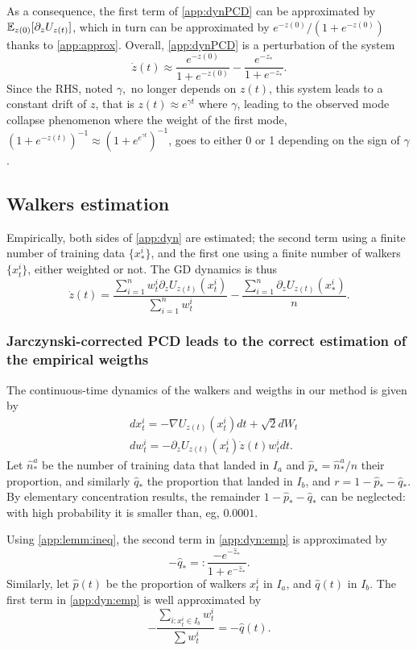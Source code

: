 \documentclass[a4paper,11pt]{extarticle}
\begin{document}
As a consequence, the first term of \eqref{app:dynPCD} can be approximated by $\mathbb{E}_{z(0)}[\partial_z U_{z(t)}]$, which in turn can be approximated by $e^{-z(0)}/(1 + e^{-z(0)})$ thanks to \eqref{app:approx}. Overall, \eqref{app:dynPCD} is a perturbation of the system
$$ \dot{z}(t)\approx \frac{e^{-z(0)}}{1 + e^{-z(0)}} - \frac{e^{-z_*}}{1 + e^{-z_*}}.$$
Since the RHS, noted $\gamma$, no longer depends on $z(t)$, this system leads to a constant drift of $z$, that is $z(t) \approx e^{\gamma t}$ where $\gamma$, leading to the observed mode collapse phenomenon where the weight of the first mode, $(1 + e^{-z(t)})^{-1} \approx (1 + e^{e^{\gamma t}})^{-1}$, goes to either 0 or 1 depending on the sign of $\gamma$. 

\subsection{Walkers estimation}

Empirically, both sides of \eqref{app:dyn} are estimated; the second term using a finite number of training data $\{x_*^i\}$, and the first one using a finite number of walkers $\{x_t^i\}$, either weighted or not. The GD dynamics is thus 
\begin{equation}\label{app:dyn:emp}
    \dot{z}(t) = \frac{\sum_{i=1}^n w_t^i \partial_z U_{z(t)}(x_t^i)}{\sum_{i=1}^n w_t^i} - \frac{\sum_{i=1}^n  \partial_z U_{z(t)}(x_*^i)}{n}. 
\end{equation}

\subsubsection*{Jarczynski-corrected PCD leads to the correct estimation of the empirical weigths}
The continuous-time dynamics of the walkers and weigths in our method is given by 
\begin{align}\label{app:systemj}
    &dx_t^i = -\nabla U_{z(t)}(x_t^i)dt + \sqrt{2}dW_t \\
    &dw_t^i = -\partial_z U_{z(t)}(x_t^i)\dot{z}(t)w_t^i dt.
\end{align}
Let $\hat{n}^a_*$ be the number of training data that landed in $I_a$ and $\hat{p}_* = \hat{n}^a_*/n$ their proportion, and similarly $\hat{q}_*$ the proportion that landed in $I_b$, and $r=1-\hat{p}_* - \hat{q}_*$. 
By elementary concentration results, the remainder $1 - \hat{p}_* - \hat{q}_*$ can be neglected: with high probability it is smaller than, eg, $0.0001$. 

Using \eqref{app:lemm:ineq}, the second term in \eqref{app:dyn:emp} is approximated by
$$- \hat{q}_* =: \frac{-e^{-\hat{z}_*}}{1 + e^{-\hat{z}_*}}.  $$
Similarly, let $\hat{p}(t)$ be the proportion of walkers $x_t^i$ in $I_a$, and $\hat{q}(t)$ in $I_b$. The first term in \eqref{app:dyn:emp} is well approximated by 
$$- \frac{\sum_{i : x_t^i \in I_b }w_t^i}{\sum w_t^i} = - \hat{q}(t).$$
\end{document}
